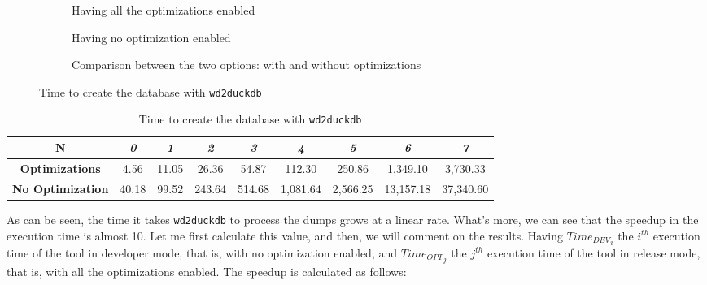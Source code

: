 \begin{figure}[p]
    \begin{subfigure}{0.49\textwidth}
        \centering
        
        \caption{Having all the optimizations enabled}
    \end{subfigure}%
    \hfill
    \begin{subfigure}{0.49\textwidth}
        \centering
        
        \caption{Having no optimization enabled}
    \end{subfigure}%
    \vspace*{1em}
    \begin{subfigure}{\textwidth}
        \centering
        
        \caption{Comparison between the two options: with and without optimizations}
    \end{subfigure}
    \caption{Time to create the database with \texttt{wd2duckdb}}
    \label{fig:wd2duckdb}
\end{figure}

\begin{table}[ht]
    \centering
    \begin{tabular}{|c|c|c|c|c|c|c|c|c|}
        \hline
        \rowcolor[HTML]{EFEFEF}
        \cellcolor[HTML]{C0C0C0}\textbf{N}               & \textit{0} & \textit{1} & \textit{2} & \textit{3} & \textit{4} & \textit{5} & \textit{6} & \textit{7} \\ \hline
        \cellcolor[HTML]{C0C0C0}\textbf{Optimizations}   & 4.56       & 11.05      & 26.36      & 54.87      & 112.30     & 250.86     & 1,349.10   & 3,730.33   \\ \hline
        \cellcolor[HTML]{C0C0C0}\textbf{No Optimization} & 40.18      & 99.52      & 243.64     & 514.68     & 1,081.64   & 2,566.25   & 13,157.18  & 37,340.60  \\ \hline
    \end{tabular}
    \caption{Time to create the database with \texttt{wd2duckdb}}
    \label{table:wd2duckdb}
\end{table}

As can be seen, the time it takes \texttt{wd2duckdb} to process the dumps grows at a linear rate. What's more, we can see that the speedup in the execution time is almost 10. Let me first calculate this value, and then, we will comment on the results. Having ${Time_{DEV}}_i$ the $i^{th}$ execution time of the tool in developer mode, that is, with no optimization enabled, and ${Time_{OPT}}_j$ the $j^{th}$ execution time of the tool in release mode, that is, with all the optimizations enabled. The speedup is calculated as follows:

